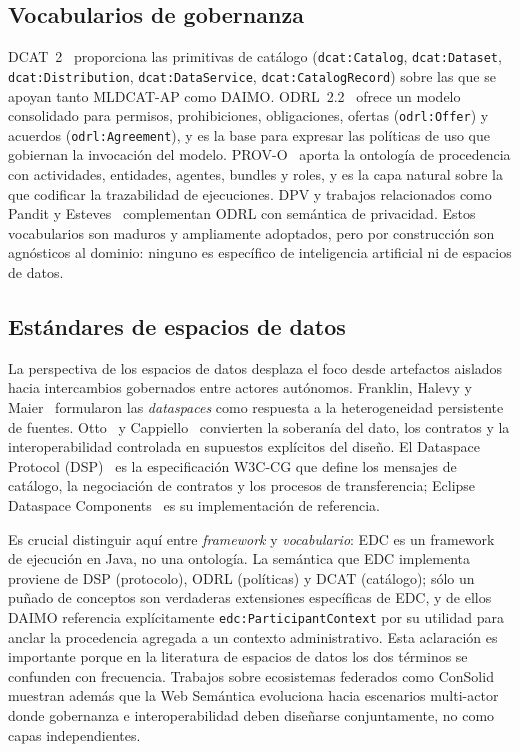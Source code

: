 \documentclass[11pt,a4paper]{article}
\newcommand{\code}[1]{\texttt{#1}}
\begin{document}
\subsection{Vocabularios de gobernanza}

DCAT~2~\cite{dcat2} proporciona las primitivas de catálogo (\code{dcat:Catalog}, \code{dcat:Dataset}, \code{dcat:Distribution}, \code{dcat:DataService}, \code{dcat:CatalogRecord}) sobre las que se apoyan tanto MLDCAT-AP como DAIMO. ODRL~2.2~\cite{odrl22} ofrece un modelo consolidado para permisos, prohibiciones, obligaciones, ofertas (\code{odrl:Offer}) y acuerdos (\code{odrl:Agreement}), y es la base para expresar las políticas de uso que gobiernan la invocación del modelo. PROV-O~\cite{provo} aporta la ontología de procedencia con actividades, entidades, agentes, bundles y roles, y es la capa natural sobre la que codificar la trazabilidad de ejecuciones. DPV y trabajos relacionados como Pandit y Esteves~\cite{pandit-esteves} complementan ODRL con semántica de privacidad. Estos vocabularios son maduros y ampliamente adoptados, pero por construcción son agnósticos al dominio: ninguno es específico de inteligencia artificial ni de espacios de datos.

\subsection{Estándares de espacios de datos}

La perspectiva de los espacios de datos desplaza el foco desde artefactos aislados hacia intercambios gobernados entre actores autónomos. Franklin, Halevy y Maier~\cite{franklin05} formularon las \emph{dataspaces} como respuesta a la heterogeneidad persistente de fuentes. Otto~\cite{otto19} y Cappiello~\cite{cappiello22} convierten la soberanía del dato, los contratos y la interoperabilidad controlada en supuestos explícitos del diseño. El Dataspace Protocol (DSP)~\cite{dsp} es la especificación W3C-CG que define los mensajes de catálogo, la negociación de contratos y los procesos de transferencia; Eclipse Dataspace Components~\cite{edc} es su implementación de referencia.

Es crucial distinguir aquí entre \emph{framework} y \emph{vocabulario}: EDC es un framework de ejecución en Java, no una ontología. La semántica que EDC implementa proviene de DSP (protocolo), ODRL (políticas) y DCAT (catálogo); sólo un puñado de conceptos son verdaderas extensiones específicas de EDC, y de ellos DAIMO referencia explícitamente \code{edc:ParticipantContext} por su utilidad para anclar la procedencia agregada a un contexto administrativo. Esta aclaración es importante porque en la literatura de espacios de datos los dos términos se confunden con frecuencia. Trabajos sobre ecosistemas federados como ConSolid~\cite{werbrouck24} muestran además que la Web Semántica evoluciona hacia escenarios multi-actor donde gobernanza e interoperabilidad deben diseñarse conjuntamente, no como capas independientes.
\end{document}
